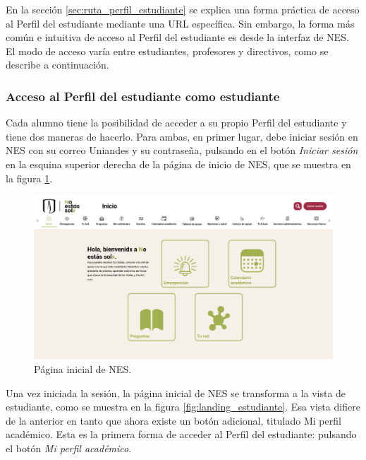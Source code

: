 En la sección \ref{sec:ruta_perfil_estudiante} se explica una forma práctica de acceso al Perfil del estudiante mediante una URL específica. Sin embargo, la forma más común e intuitiva de acceso al Perfil del estudiante es desde la interfaz de \gls{NES}. El modo de acceso varía entre estudiantes, profesores y directivos, como se describe a continuación.

\subsubsection{Acceso al Perfil del estudiante como estudiante}

Cada alumno tiene la posibilidad de acceder a su propio Perfil del estudiante y tiene dos maneras de hacerlo. Para ambas, en primer lugar, debe iniciar sesión en \gls{NES} con su correo Uniandes y su contraseña, pulsando en el botón \textit{Iniciar sesión} en la esquina superior derecha de la página de inicio de \gls{NES}, que se muestra en la figura \ref{fig:landing}.

\begin{figure}[H]
	\centering
	\includegraphics[width=\textwidth]{assets/nes/landing.png}
	\caption{Página inicial de NES.}
	\label{fig:landing}
\end{figure}

Una vez iniciada la sesión, la página inicial de NES se transforma a la vista de estudiante, como se muestra en la figura \ref{fig:landing_estudiante}. Esa vista difiere de la anterior en tanto que ahora existe un botón adicional, titulado Mi perfil académico. Esta es la primera forma de acceder al Perfil del estudiante: pulsando el botón \textit{Mi perfil académico}.

